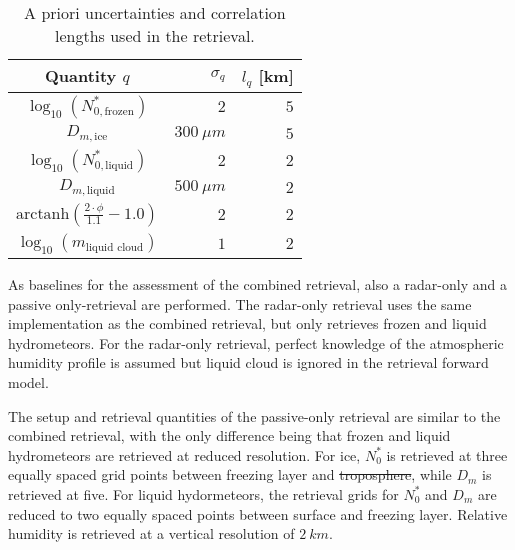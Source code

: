 \documentclass[journal abbreviation, manuscript]{copernicus}
\providecommand{\DIFadd}[1]{{\protect\color{blue}\uwave{#1}}} %
\providecommand{\DIFdel}[1]{{\protect\color{red}\sout{#1}}}                      %
\providecommand{\DIFaddbegin}{} %
\providecommand{\DIFaddend}{} %
\providecommand{\DIFdelbegin}{} %
\providecommand{\DIFdelend}{} %
\begin{document}
\begin{table}[h!]
\caption{A priori uncertainties and correlation
 lengths used in the retrieval.}
 \centering
\label{tab:a_priori}
    \begin{tabular}{c|r|r}
     Quantity $q$ & $\sigma_q$ & $l_q$ [km]\\
    \hline
    $\log_{10}(N_{0, \text{frozen}}^*)$    & $2$                       & $5$ \\
    $D_{m, \text{ice}}$               & $300\ \unit{\mu m}$          & $5$ \\
    $\log_{10}(N_{0, \text{liquid}}^*)$    & $2                      $ & $2$ \\
    $D_{m, \text{liquid}}$            & $500\ \unit{\mu m}$           & $2$ \\
    $\text{arctanh}(\frac{2 \cdot \phi}{1.1} - 1.0)$ & $2$       & $2$ \\
    $\log_{10}(m_\text{liquid cloud}) $ & $1$                       & $2$ \\
    \end{tabular}
\end{table}

As baselines for the assessment of the combined retrieval, also a radar-only and
a passive only-retrieval are performed. The radar-only retrieval uses the same
implementation as the combined retrieval, but only retrieves frozen and liquid
hydrometeors. For the radar-only retrieval, perfect knowledge of the atmospheric
humidity profile is assumed but liquid cloud is ignored in the retrieval forward
model.

The setup and retrieval quantities of the passive-only retrieval are similar to
the combined retrieval, with the only difference being that frozen and liquid
hydrometeors are retrieved at reduced resolution. For ice, $N_0^*$ is retrieved
at three equally spaced grid points between freezing layer and \DIFdelbegin \DIFdel{troposphere}\DIFdelend \DIFaddbegin \DIFadd{tropopause}\DIFaddend , while
$D_m$ is retrieved at five. For liquid hydormeteors, the retrieval grids for
$N_0^*$ and $D_m$ are reduced to two equally spaced points between surface and
freezing layer. Relative humidity is retrieved at a vertical resolution of
$2\ \unit{km}$.

\DIFaddbegin \subsubsection{\DIFadd{Particle models}}
\label{sec:method:partilce_models}
\end{document}
